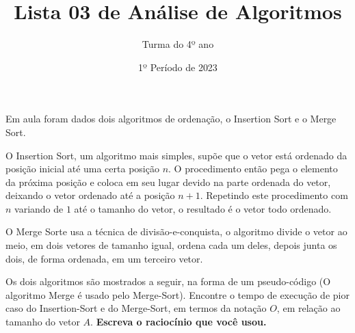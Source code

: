 \documentclass[12pt]{article}
\title{Lista 03 de Análise de Algoritmos}
\date{1º Período de 2023}
\author{Turma do 4º ano}
\begin{document}
\maketitle


\vspace{3em}

Em aula foram dados dois algoritmos de ordenação, o Insertion Sort e o Merge Sort. 

O Insertion Sort, um algoritmo mais simples, supõe que o vetor está ordenado da posição inicial até uma certa posição $n$. O procedimento então pega o elemento da próxima posição e coloca em seu lugar devido na parte ordenada do vetor, deixando o vetor ordenado até a posição $n+1$.
Repetindo este procedimento com $n$ variando de $1$ até o tamanho do vetor, o resultado é o vetor todo ordenado.

O Merge Sorte usa a técnica de divisão-e-conquista, o algoritmo divide o vetor ao meio, em dois vetores de tamanho igual, ordena cada um deles, depois junta os dois, de forma ordenada, em um terceiro vetor.

Os dois algoritmos são mostrados a seguir, na forma de um pseudo-código (O algoritmo Merge é usado pelo Merge-Sort).
Encontre o tempo de execução de pior caso do Insertion-Sort e do Merge-Sort, em termos da notação $O$, em relação ao tamanho do vetor $A$. \textbf{Escreva o raciocínio que você usou.}







\end{document}
